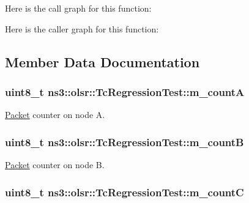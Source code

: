 Here is the call graph for this function\+:




Here is the caller graph for this function\+:




\subsection{Member Data Documentation}
\subsubsection[{\texorpdfstring{m\+\_\+countA}{m_countA}}]{\setlength{\rightskip}{0pt plus 5cm}uint8\+\_\+t ns3\+::olsr\+::\+Tc\+Regression\+Test\+::m\+\_\+countA\hspace{0.3cm}{\ttfamily [private]}}\hypertarget{classns3_1_1olsr_1_1TcRegressionTest_ad4df9f9a1950da47355d1623fb2a57ed}{}\label{classns3_1_1olsr_1_1TcRegressionTest_ad4df9f9a1950da47355d1623fb2a57ed}


\hyperlink{classns3_1_1Packet}{Packet} counter on node A. 

\subsubsection[{\texorpdfstring{m\+\_\+countB}{m_countB}}]{\setlength{\rightskip}{0pt plus 5cm}uint8\+\_\+t ns3\+::olsr\+::\+Tc\+Regression\+Test\+::m\+\_\+countB\hspace{0.3cm}{\ttfamily [private]}}\hypertarget{classns3_1_1olsr_1_1TcRegressionTest_a600c2880459f6b10640afc51fa268c91}{}\label{classns3_1_1olsr_1_1TcRegressionTest_a600c2880459f6b10640afc51fa268c91}


\hyperlink{classns3_1_1Packet}{Packet} counter on node B. 

\subsubsection[{\texorpdfstring{m\+\_\+countC}{m_countC}}]{\setlength{\rightskip}{0pt plus 5cm}uint8\+\_\+t ns3\+::olsr\+::\+Tc\+Regression\+Test\+::m\+\_\+countC\hspace{0.3cm}{\ttfamily [private]}}\hypertarget{classns3_1_1olsr_1_1TcRegressionTest_a7ff866c3417a672eb3bb43f08a399eaa}{}\label{classns3_1_1olsr_1_1TcRegressionTest_a7ff866c3417a672eb3bb43f08a399eaa}


